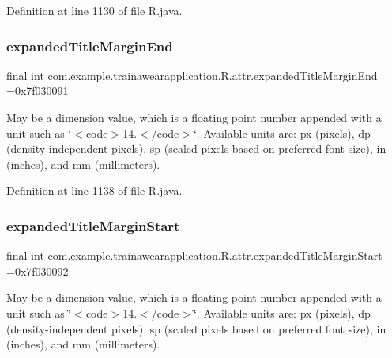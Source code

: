 Definition at line 1130 of file R.\+java.

\mbox{\label{classcom_1_1example_1_1trainawearapplication_1_1_r_1_1attr_a71d5de5fa339df031f228e8a7c0f793d}} 
\subsubsection{\texorpdfstring{expandedTitleMarginEnd}{expandedTitleMarginEnd}}
{\footnotesize\ttfamily final int com.\+example.\+trainawearapplication.\+R.\+attr.\+expanded\+Title\+Margin\+End =0x7f030091\hspace{0.3cm}{\ttfamily [static]}}

May be a dimension value, which is a floating point number appended with a unit such as \char`\"{}$<$code$>$14.\+5sp$<$/code$>$\char`\"{}. Available units are\+: px (pixels), dp (density-\/independent pixels), sp (scaled pixels based on preferred font size), in (inches), and mm (millimeters). 

Definition at line 1138 of file R.\+java.

\mbox{\label{classcom_1_1example_1_1trainawearapplication_1_1_r_1_1attr_acabd195844e822d24e5fb34e631f972e}} 
\subsubsection{\texorpdfstring{expandedTitleMarginStart}{expandedTitleMarginStart}}
{\footnotesize\ttfamily final int com.\+example.\+trainawearapplication.\+R.\+attr.\+expanded\+Title\+Margin\+Start =0x7f030092\hspace{0.3cm}{\ttfamily [static]}}

May be a dimension value, which is a floating point number appended with a unit such as \char`\"{}$<$code$>$14.\+5sp$<$/code$>$\char`\"{}. Available units are\+: px (pixels), dp (density-\/independent pixels), sp (scaled pixels based on preferred font size), in (inches), and mm (millimeters). 

